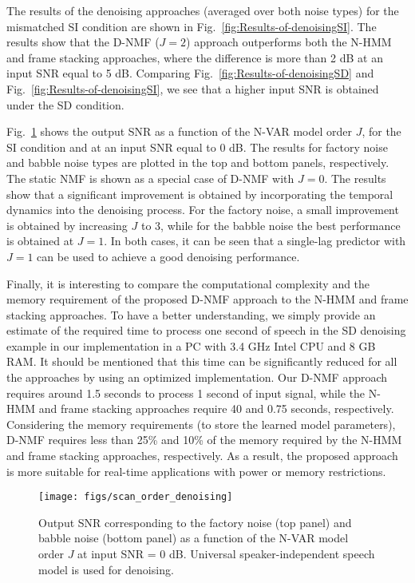\documentclass[10pt,twocolumn,twoside] {IEEEtran}
\begin{document}
The results of the denoising approaches (averaged over both noise types) for the mismatched SI condition are shown in Fig.~\ref{fig:Results-of-denoisingSI}. The results show that the D-NMF ($J=2$) approach outperforms both the N-HMM and frame stacking approaches, where the difference is more than 2 dB at an input SNR equal to 5 dB. Comparing Fig.~\ref{fig:Results-of-denoisingSD} and Fig.~\ref{fig:Results-of-denoisingSI}, we see that a higher input SNR is obtained under the SD condition.

Fig.~\ref{fig:scan_order_denoising} shows the output SNR as a function of the N-VAR model order $J$, for the SI condition and at an input SNR equal to 0 dB. The results for factory noise and babble noise types are plotted in the top and bottom panels, respectively. The static NMF is shown as a special case of D-NMF with $J=0$. The results show that a significant improvement is obtained by incorporating the temporal dynamics into the denoising process. For the factory noise, a small improvement is obtained by increasing $J$ to 3, while for the babble noise the best performance is obtained at $J=1$. In both cases, it can be seen that a single-lag predictor with $J=1$ can be used to achieve a good denoising performance.

Finally, it is interesting to compare the computational complexity and the memory requirement of the proposed D-NMF approach to the N-HMM and frame stacking approaches. To have a better understanding, we simply provide an estimate of the required time to process one second of speech in the SD denoising example in our implementation in a PC
with 3.4 GHz Intel CPU and 8 GB RAM. It should be mentioned that this time can be significantly reduced for all the approaches by using an optimized implementation. Our D-NMF approach requires around 1.5 seconds to process 1 second of input signal, while the N-HMM and frame stacking approaches require 40 and 0.75 seconds, respectively. Considering the memory requirements (to store the learned model parameters), D-NMF requires less than 25\% and 10\% of the memory required by the N-HMM and frame stacking approaches, respectively. As a result, the proposed approach is more suitable for real-time applications with power or memory restrictions.

\begin{figure}
\texttt{[image: figs/scan\_order\_denoising]}
\caption{\label{fig:scan_order_denoising} Output SNR corresponding to the factory noise (top panel) and babble noise (bottom panel) as a function of
the N-VAR model order $J$ at input SNR = 0 dB. Universal speaker-independent speech model is used for denoising.}
\end{figure}
\end{document}
